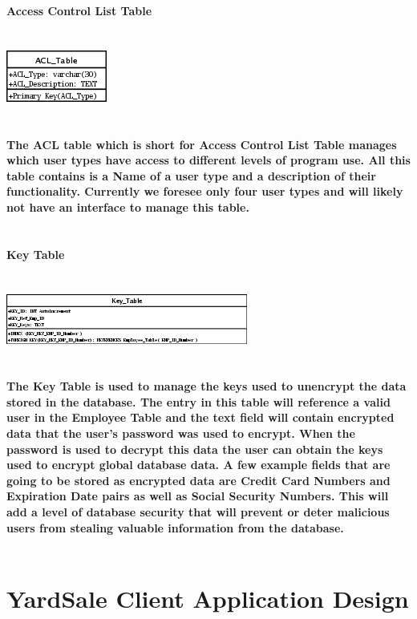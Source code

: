 \documentclass{report}
\begin{document}
	\bf{Access Control List Table}\\
	\\
	\\
	\includegraphics{Tables/ACL.png}\\
	\\
	\\
	The ACL table which is short for Access Control List Table manages which user types have access
	to different levels of program use. All this table contains is a Name of a user type and a description
	of their functionality. Currently we foresee only four user types and will likely not have an
	interface to manage this table.\\
	\\
	\\
	\bf{Key Table}\\
	\\
	\\
	\includegraphics{Tables/KeyTable.png}\\
	\\
	\\
	The Key Table is used to manage the keys used to unencrypt the data stored in the database. The
	entry in this table will reference a valid user in the Employee Table and the text field will
	contain encrypted data that the user's password was used to encrypt. When the password is used
	to decrypt this data the user can obtain the keys used to encrypt global database data. A few
	example fields that are going to be stored as encrypted data are Credit Card Numbers and Expiration
	Date pairs as well as Social Security Numbers. This will add a level of database security that
	will prevent or deter malicious users from stealing valuable information from the database.\\
	\\

	\newpage
	
	\section{YardSale Client Application Design}
\end{document}
